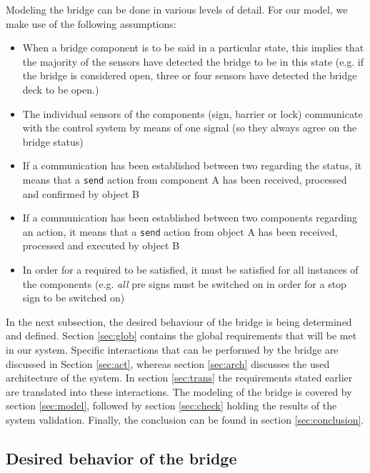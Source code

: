Modeling the bridge can be done in various levels of detail. For our model, we make use of the following assumptions:
%
\begin{itemize}
	\item When a bridge component is to be said in a particular state, this implies that the majority of the sensors have detected the bridge to be in this state (e.g. if the bridge is considered open, three or four sensors have detected the bridge deck to be open.)
	\item	The individual sensors of the components (sign, barrier or lock) communicate with the control system by means of one signal (so they always agree on the bridge status)
	\item If a communication has been established between two regarding the status, it means that a \texttt{send} action from component A has been received, processed and confirmed by object B
	\item If a communication has been established between two components regarding an action, it means that a \texttt{send} action from object A has been received, processed and executed by object B
	\item In order for a required to be satisfied, it must be satisfied for all instances of the components (e.g. \emph{all} pre signs must be switched on in order for a stop sign to be switched on)
\end{itemize}
%
In the next subsection, the desired behaviour of the bridge is being determined and defined. Section \ref{sec:glob} contains the global requirements that will be met in our system. Specific interactions that can be performed by the bridge are discussed in Section \ref{sec:act}, whereas section \ref{sec:arch} discusses the used architecture of the system. In section \ref{sec:trans} the requirements stated earlier are translated into these interactions. The modeling of the bridge is covered by section \ref{sec:model}, followed by section \ref{sec:check} holding the results of the system validation. Finally, the conclusion can be found in section \ref{sec:conclusion}.

\subsection{Desired behavior of the bridge}

